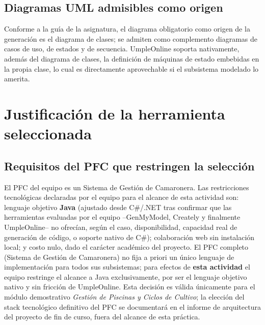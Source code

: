 \documentclass[11pt,a4paper]{article}
\begin{document}
\subsection{Diagramas UML admisibles como origen}
Conforme a la gu\'ia de la asignatura, el diagrama obligatorio como origen de la generaci\'on es el diagrama de clases; se admiten como complemento diagramas de casos de uso, de estados y de secuencia. UmpleOnline soporta nativamente, adem\'as del diagrama de clases, la definici\'on de m\'aquinas de estado embebidas en la propia clase, lo cual es directamente aprovechable si el subsistema modelado lo amerita.


\section{Justificaci\'on de la herramienta seleccionada}
\label{sec:justificacion}

\subsection{Requisitos del PFC que restringen la selecci\'on}
El PFC del equipo es un Sistema de Gesti\'on de Camaronera. Las restricciones tecnol\'ogicas declaradas por el equipo para el alcance de esta actividad son: lenguaje objetivo \textbf{Java} (ajustado desde C\#/.NET tras confirmar que las herramientas evaluadas por el equipo --GenMyModel, Creately y finalmente UmpleOnline-- no ofrec\'ian, seg\'un el caso, disponibilidad, capacidad real de generaci\'on de c\'odigo, o soporte nativo de C\#); colaboraci\'on web sin instalaci\'on local; y costo nulo, dado el car\'acter acad\'emico del proyecto. El PFC completo (Sistema de Gesti\'on de Camaronera) no fija a priori un \'unico lenguaje de implementaci\'on para todos sus subsistemas; para efectos de \textbf{esta actividad} el equipo restringe el alcance a Java exclusivamente, por ser el lenguaje objetivo nativo y sin fricci\'on de UmpleOnline. Esta decisi\'on es v\'alida \'unicamente para el m\'odulo demostrativo \emph{Gesti\'on de Piscinas y Ciclos de Cultivo}; la elecci\'on del stack tecnol\'ogico definitivo del PFC se documentar\'a en el informe de arquitectura del proyecto de fin de curso, fuera del alcance de esta pr\'actica.
\end{document}
